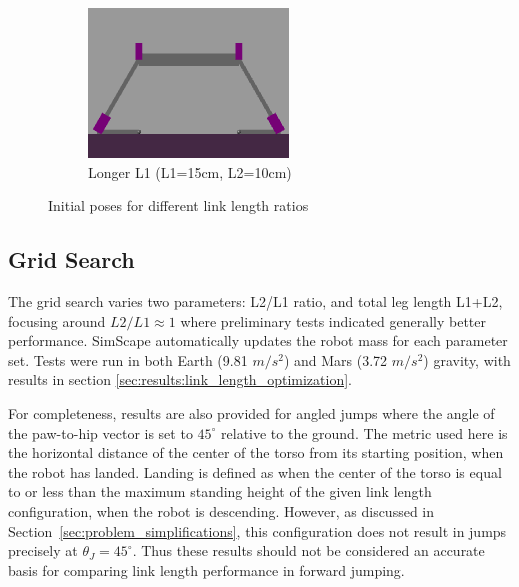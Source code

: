 \begin{figure}[h]
\begin{subfigure}[b]{0.32\textwidth}
    \end{subfigure}
    \hfill
    \begin{subfigure}[b]{0.32\textwidth}
        \centering
        \includegraphics[width=\textwidth]{Images/link_length_optimization/longer_L1_pose.png}
        \caption{Longer L1 (L1=15cm, L2=10cm)}
        \label{fig:link_length_optimization:longer_L1_pose}
    \end{subfigure}
    \caption{Initial poses for different link length ratios}
    \label{fig:link_length_optimization:initial_poses}
\end{figure}



\subsection{Grid Search}
The grid search varies two parameters: L2/L1 ratio, and total leg length L1+L2, focusing around $L2/L1\approx1$ where preliminary tests indicated generally better performance. SimScape automatically updates the robot mass for each parameter set. Tests were run in both Earth (9.81 $m/s^2$) and Mars (3.72 $m/s^2$) gravity, with results in section \ref{sec:results:link_length_optimization}.

For completeness, results are also provided for angled jumps where the angle of the paw-to-hip vector is set to \(45^{\circ}\) relative to the ground. The metric used here is the horizontal distance of the center of the torso from its starting position, when the robot has landed. Landing is defined as when the center of the torso is equal to or less than the maximum standing height of the given link length configuration, when the robot is descending. However, as discussed in Section~\ref{sec:problem_simplifications}, this configuration does not result in jumps precisely at \(\theta_J = 45^{\circ}\). Thus these results should not be considered an accurate basis for comparing link length performance in forward jumping.